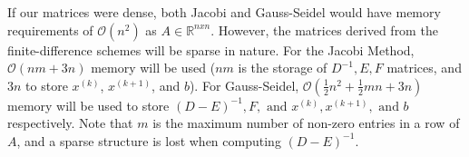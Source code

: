 If our matrices were dense, both Jacobi and Gauss-Seidel would have memory requirements of $\mathcal{O}(n^2)$ as $A \in \mathbb{R}^{nxn}$. However, the matrices derived from the finite-difference schemes will be sparse in nature. For the Jacobi Method, $\mathcal{O}(nm + 3n)$ memory will be used ($nm$ is the storage of $D^{-1},E,F$ matrices, and $3n$ to store $x^{(k)}$, $x^{(k+1)}$, and $b$). For Gauss-Seidel, $\mathcal{O}(\frac{1}{2}n^2 + \frac{1}{2}mn + 3n)$ memory will be used to store $(D-E)^{-1}, F, \text{ and } x^{(k)}, x^{(k+1)}, \text{ and } b$ respectively. Note that $m$ is the maximum number of non-zero entries in a row of $A$, and a sparse structure is lost when computing $(D-E)^{-1}$.



